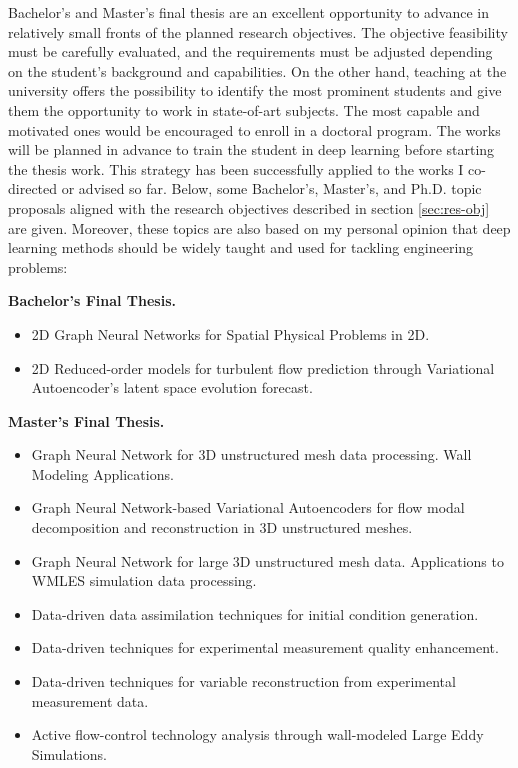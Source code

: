 \documentclass{article}
\begin{document}
Bachelor's and Master's final thesis are an excellent opportunity to advance in relatively small fronts of the planned research objectives. The objective feasibility must be carefully evaluated, and the requirements must be adjusted depending on the student's background and capabilities. On the other hand, teaching at the university offers the possibility to identify the most prominent students and give them the opportunity to work in state-of-art subjects. The most capable and motivated ones would be encouraged to enroll in a doctoral program.
The works will be planned in advance to train the student in deep learning before starting the thesis work. This strategy has been successfully applied to the works I co-directed or advised so far. Below, some Bachelor's, Master's, and Ph.D. topic proposals aligned with the research objectives described in section \ref{sec:res-obj} are given. Moreover, these topics are also based on my personal opinion that deep learning methods should be widely taught and used for tackling engineering problems:

{\bf Bachelor's Final Thesis.} 

\begin{itemize}[noitemsep]
\item 2D Graph Neural Networks for Spatial Physical Problems in 2D.
\item 2D Reduced-order models for turbulent flow prediction through Variational Autoencoder's latent space evolution forecast.
\end{itemize}

{\bf Master's Final Thesis.}

\begin{itemize}[noitemsep]
\item Graph Neural Network for 3D unstructured mesh data processing. Wall Modeling Applications.
\item Graph Neural Network-based Variational Autoencoders for flow modal decomposition and reconstruction in 3D unstructured meshes.
\item Graph Neural Network for large 3D unstructured mesh data. Applications to WMLES simulation data processing.
\item Data-driven data assimilation techniques for initial condition generation.
\item Data-driven techniques for experimental measurement quality enhancement.  
\item Data-driven techniques for variable reconstruction from experimental measurement data. 
\item Active flow-control technology analysis  through wall-modeled Large Eddy Simulations.
\end{itemize}
\end{document}
